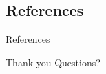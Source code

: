 \documentclass[12pt,
               color={usenames,   %
                      dvipsnames},%
                    ]{beamer}
\begin{document}
\subsection*{References}
\begin{frame}[allowframebreaks]{References}
  \scriptsize %
  
\end{frame}


\begin{frame}{Thank you}
  Questions?
\end{frame}

\end{document}
